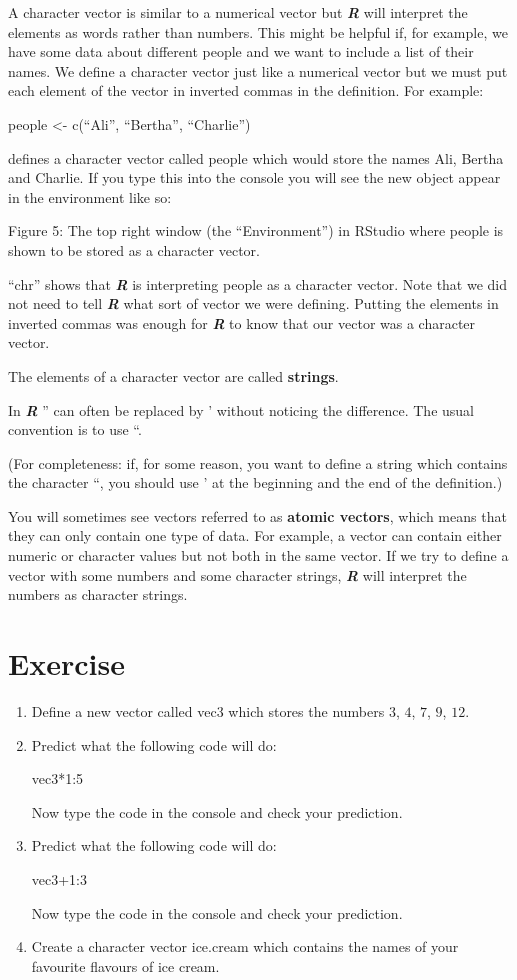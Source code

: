 \documentclass[
]{book}
\providecommand{\tightlist}{%
  \setlength{\itemsep}{0pt}\setlength{\parskip}{0pt}}
\begin{document}
A character vector is similar to a numerical vector but \textbf{\emph{R}} will interpret the elements as words rather than numbers. This might be helpful if, for example, we have some data about different people and we want to include a list of their names. We define a character vector just like a numerical vector but we must put each element of the vector in inverted commas in the definition. For example:

people \textless- c(``Ali'', ``Bertha'', ``Charlie'')

defines a character vector called people which would store the names Ali, Bertha and Charlie. If you type this into the console you will see the new object appear in the environment like so:

Figure 5: The top right window (the ``Environment'') in RStudio where people is shown to be stored as a character vector.

``chr'' shows that \textbf{\emph{R}} is interpreting people as a character vector. Note that we did not need to tell \textbf{\emph{R}} what sort of vector we were defining. Putting the elements in inverted commas was enough for \textbf{\emph{R}} to know that our vector was a character vector.

The elements of a character vector are called \textbf{strings}.

In \textbf{\emph{R}} '' can often be replaced by ' without noticing the difference. The usual convention is to use ``.

(For completeness: if, for some reason, you want to define a string which contains the character ``, you should use ' at the beginning and the end of the definition.)

You will sometimes see vectors referred to as \textbf{atomic vectors}, which means that they can only contain one type of data. For example, a vector can contain either numeric or character values but not both in the same vector. If we try to define a vector with some numbers and some character strings, \textbf{\emph{R}} will interpret the numbers as character strings.

\section{Exercise}\label{exercise-1}

\begin{enumerate}
\def\labelenumi{\arabic{enumi}.}
\tightlist
\item
  Define a new vector called vec3 which stores the numbers \(3\), \(4\), \(7\), \(9\), \(12\).
\item
  Predict what the following code will do:

  vec3*1:5

  Now type the code in the console and check your prediction.
\item
  Predict what the following code will do:

  vec3+1:3

  Now type the code in the console and check your prediction.
\item
  Create a character vector ice.cream which contains the names of your favourite flavours of ice cream.
\end{enumerate}
\end{document}
